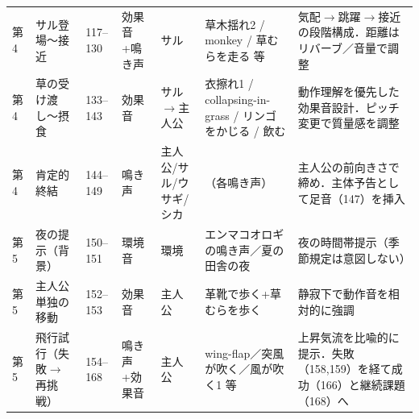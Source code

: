 \begin{longtable}{p{0.6cm} p{2.8cm} p{1.6cm} p{1.5cm} p{1.5cm} p{3.0cm} p{4.1cm}}
	第4          & サル登場〜接近              & 117--130                & 効果音+鳴き声     & サル            & 草木揺れ2 / monkey / 草むらを走る 等                 & 気配$\to$跳躍$\to$接近の段階構成．距離はリバーブ／音量で調整          \\
	第4          & 草の受け渡し〜摂食            & 133--143                & 効果音         & サル$\to$主人公    & 衣擦れ1 / collapsing-in-grass / リンゴをかじる / 飲む & 動作理解を優先した効果音設計．ピッチ変更で質量感を調整                  \\
	第4          & 肯定的終結                & 144--149                & 鳴き声         & 主人公/サル/ウサギ/シカ & （各鳴き声）                                    & 主人公の前向きさで締め．主体予告として足音（147）を挿入                \\

	第5          & 夜の提示（背景）             & 150--151                & 環境音         & 環境            & エンマコオロギの鳴き声／夏の田舎の夜                        & 夜の時間帯提示（季節規定は意図しない）                          \\
	第5          & 主人公単独の移動             & 152--153                & 効果音         & 主人公           & 革靴で歩く+草むらを歩く                              & 静寂下で動作音を相対的に強調                               \\
	第5          & 飛行試行（失敗$\to$再挑戦）     & 154--168                & 鳴き声+効果音     & 主人公           & wing-flap／突風が吹く／風が吹く1 等                   & 上昇気流を比喩的に提示．失敗（158,159）を経て成功（166）と継続課題（168）へ \\
\end{longtable}
\label{app:sound-event-table}

\clearpage
\twocolumn
\endinput
